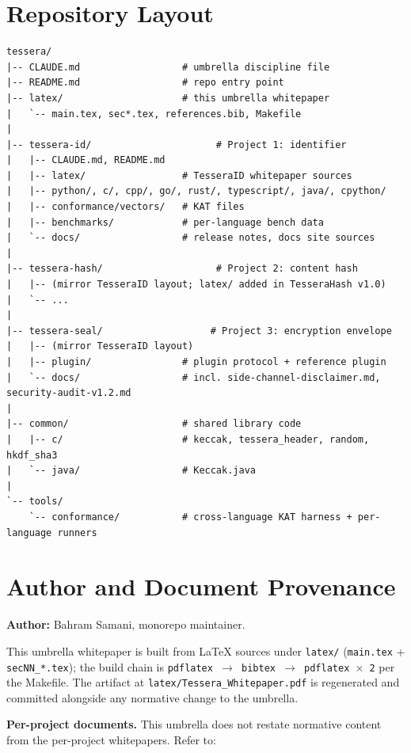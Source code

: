 \section{Repository Layout}
\label{sec:appendix-layout}

\begin{lstlisting}[language=Pseudocode]
tessera/
|-- CLAUDE.md                  # umbrella discipline file
|-- README.md                  # repo entry point
|-- latex/                     # this umbrella whitepaper
|   `-- main.tex, sec*.tex, references.bib, Makefile
|
|-- tessera-id/                      # Project 1: identifier
|   |-- CLAUDE.md, README.md
|   |-- latex/                 # TesseraID whitepaper sources
|   |-- python/, c/, cpp/, go/, rust/, typescript/, java/, cpython/
|   |-- conformance/vectors/   # KAT files
|   |-- benchmarks/            # per-language bench data
|   `-- docs/                  # release notes, docs site sources
|
|-- tessera-hash/                    # Project 2: content hash
|   |-- (mirror TesseraID layout; latex/ added in TesseraHash v1.0)
|   `-- ...
|
|-- tessera-seal/                   # Project 3: encryption envelope
|   |-- (mirror TesseraID layout)
|   |-- plugin/                # plugin protocol + reference plugin
|   `-- docs/                  # incl. side-channel-disclaimer.md, security-audit-v1.2.md
|
|-- common/                    # shared library code
|   |-- c/                     # keccak, tessera_header, random, hkdf_sha3
|   `-- java/                  # Keccak.java
|
`-- tools/
    `-- conformance/           # cross-language KAT harness + per-language runners
\end{lstlisting}

\section{Author and Document Provenance}
\label{sec:appendix-provenance}

\textbf{Author:} Bahram Samani, \tessera{} monorepo maintainer.

This umbrella whitepaper is built from LaTeX sources under \texttt{latex/} (\texttt{main.tex} + \texttt{secNN\_*.tex}); the build chain is \texttt{pdflatex $\rightarrow$ bibtex $\rightarrow$ pdflatex $\times$ 2} per the Makefile. The artifact at \texttt{latex/Tessera\_Whitepaper.pdf} is regenerated and committed alongside any normative change to the umbrella.

\textbf{Per-project documents.} This umbrella does not restate normative content from the per-project whitepapers. Refer to:

